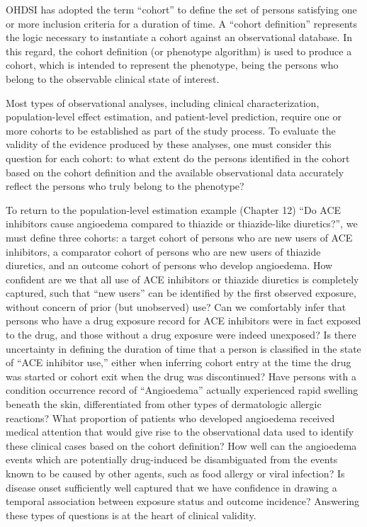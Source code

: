 \documentclass[
  letterpaper,
  paper=7in:10in,
  pagesize=pdftex,
  headinclude=on,
  footinclude=on,
  12pt]{scrbook}
\begin{document}
OHDSI has adopted the term ``cohort'' to define the set of persons
satisfying one or more inclusion criteria for a duration of time. A
``cohort definition'' represents the logic necessary to instantiate a
cohort against an observational database. In this regard, the cohort
definition (or phenotype algorithm) is used to produce a cohort, which
is intended to represent the phenotype, being the persons who belong to
the observable clinical state of interest.

Most types of observational analyses, including clinical
characterization, population-level effect estimation, and patient-level
prediction, require one or more cohorts to be established as part of the
study process. To evaluate the validity of the evidence produced by
these analyses, one must consider this question for each cohort: to what
extent do the persons identified in the cohort based on the cohort
definition and the available observational data accurately reflect the
persons who truly belong to the phenotype?

To return to the population-level estimation example (Chapter 12) ``Do
ACE inhibitors cause angioedema compared to thiazide or thiazide-like
diuretics?'', we must define three cohorts: a target cohort of persons
who are new users of ACE inhibitors, a comparator cohort of persons who
are new users of thiazide diuretics, and an outcome cohort of persons
who develop angioedema. How confident are we that all use of ACE
inhibitors or thiazide diuretics is completely captured, such that ``new
users'' can be identified by the first observed exposure, without
concern of prior (but unobserved) use? Can we comfortably infer that
persons who have a drug exposure record for ACE inhibitors were in fact
exposed to the drug, and those without a drug exposure were indeed
unexposed? Is there uncertainty in defining the duration of time that a
person is classified in the state of ``ACE inhibitor use,'' either when
inferring cohort entry at the time the drug was started or cohort exit
when the drug was discontinued? Have persons with a condition occurrence
record of ``Angioedema'' actually experienced rapid swelling beneath the
skin, differentiated from other types of dermatologic allergic
reactions? What proportion of patients who developed angioedema received
medical attention that would give rise to the observational data used to
identify these clinical cases based on the cohort definition? How well
can the angioedema events which are potentially drug-induced be
disambiguated from the events known to be caused by other agents, such
as food allergy or viral infection? Is disease onset sufficiently well
captured that we have confidence in drawing a temporal association
between exposure status and outcome incidence? Answering these types of
questions is at the heart of clinical validity.
\end{document}
